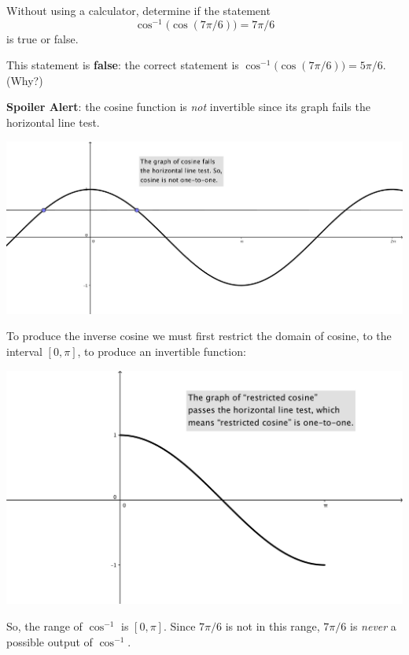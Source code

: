 \documentclass[nooutcomes,handout]{ximera}
\begin{document}
\begin{problem}
 Without using a calculator, determine if the statement
  \[
    \cos^{-1}\bigl(\cos(7\pi/6)\bigr) = 7\pi/6
  \]
  is true or false.
  \begin{freeResponse}
    This statement is \textbf{false}: the correct statement is $\cos^{-1}\bigl(\cos(7\pi/6)\bigr) = 5\pi/6$. (Why?)

    \textbf{Spoiler Alert}: the cosine function is \emph{not} invertible since its graph fails the horizontal line test.
    \begin{image}
      \includegraphics[scale = 0.8]{figure1.png}
    \end{image}
    To produce the inverse cosine we must first restrict the domain of cosine, to the interval $[0, \pi]$, to produce an invertible function:
    \begin{image}
      \includegraphics[scale = 0.8]{figure2.png}
    \end{image}
    So, the range of $\cos^{-1}$ is $[0, \pi]$.
    Since $7\pi/6$ is not in this range, $7\pi/6$ is \emph{never} a possible output of $\cos^{-1}$.
  \end{freeResponse}
\end{problem}
\end{document}
